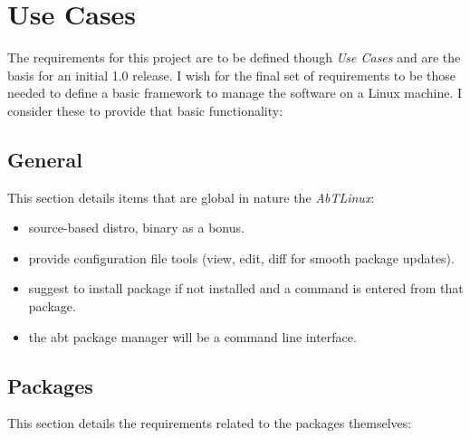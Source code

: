 \section{Use Cases}
The requirements for this project are to be defined though \emph{Use Cases}
and are the basis for an initial 1.0 release. I wish for the final set of
requirements to be those needed to define a basic framework to manage the
software on a Linux machine. I consider these to provide that basic
functionality:

\subsection{General}
This section details items that are global in nature the \emph{AbTLinux}:

\begin{itemize}
\item source-based distro, binary as a bonus.
\item provide configuration file tools (view, edit, diff for smooth package updates).
\item suggest to install package if not installed and a command is entered from that package.
\item the abt package manager will be a command line interface.
\end{itemize}


\subsection{Packages}
This section details the requirements related to the packages themselves:

